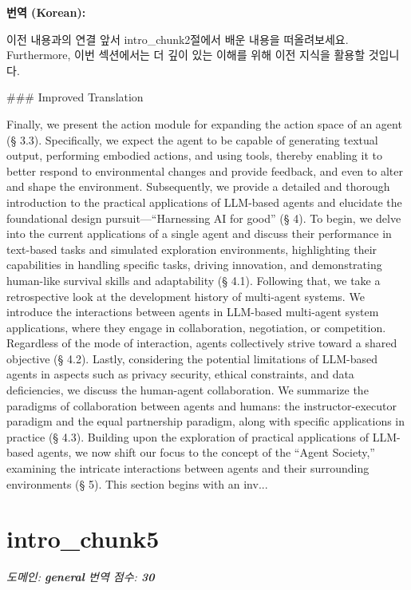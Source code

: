 \documentclass[12pt,a4paper]{article}
\begin{document}
\begin{mdframed}[style=ko]
\noindent\textbf{\small 번역 (Korean):}\\[2pt]
\begin{linkbox}{이전 내용과의 연결}
  앞서 intro_chunk2절에서 배운 내용을 떠올려보세요. Furthermore, 이번 섹션에서는 더 깊이 있는 이해를 위해 이전 지식을 활용할 것입니다.
\end{linkbox}
### Improved Translation

Finally, we present the action module for expanding the action space of an agent (§ 3.3). Specifically, we expect the agent to be capable of generating textual output, performing embodied actions, and using tools, thereby enabling it to better respond to environmental changes and provide feedback, and even to alter and shape the environment. Subsequently, we provide a detailed and thorough introduction to the practical applications of LLM-based agents and elucidate the foundational design pursuit—“Harnessing AI for good” (§ 4). To begin, we delve into the current applications of a single agent and discuss their performance in text-based tasks and simulated exploration environments, highlighting their capabilities in handling specific tasks, driving innovation, and demonstrating human-like survival skills and adaptability (§ 4.1). Following that, we take a retrospective look at the development history of multi-agent systems. We introduce the interactions between agents in LLM-based multi-agent system applications, where they engage in collaboration, negotiation, or competition. Regardless of the mode of interaction, agents collectively strive toward a shared objective (§ 4.2). Lastly, considering the potential limitations of LLM-based agents in aspects such as privacy security, ethical constraints, and data deficiencies, we discuss the human-agent collaboration. We summarize the paradigms of collaboration between agents and humans: the instructor-executor paradigm and the equal partnership paradigm, along with specific applications in practice (§ 4.3). Building upon the exploration of practical applications of LLM-based agents, we now shift our focus to the concept of the “Agent Society,” examining the intricate interactions between agents and their surrounding environments (§ 5). This section begins with an inv...
\end{mdframed}
\vspace{1em}

\section{intro\_chunk5}
\noindent\textit{\small 도메인: \textbf{general} \quad 번역 점수: \textbf{\color{red!70!black}30}}
\vspace{0.5em}
\end{document}
